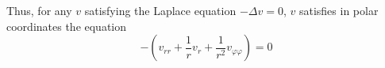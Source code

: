Thus, for any $v$ satisfying the Laplace equation $-\Delta v = 0$, $v$ satisfies in polar coordinates the equation
\begin{equation}
	-\left(v_{rr} + \frac{1}{r} v_r + \frac{1}{r^2} v_{\varphi\varphi}\right)=0
\end{equation}
%

%

%
%

%

%
